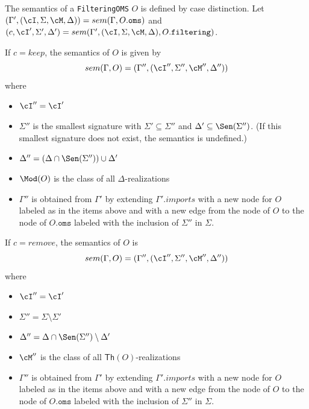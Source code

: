 \documentclass[10pt, a4paper]{isov2}
\newcommand*{\syntax}[1]{\texttt{#1}}
\renewcommand{\Th}{\mathsf{Th}}
\begin{document}
The semantics of a \syntax{FilteringOMS} $O$
is defined by case distinction.
Let
 $(\Gamma',(\cI,\Sigma,\cM, \Delta)) = sem(\Gamma, O.\syntax{oms})$ and \\
 $(c, \cI',\Sigma',\Delta') = sem(\Gamma', (\cI, \Sigma, \cM, \Delta), O.\syntax{filtering})$.

If $c = keep$,
the semantics of $O$ is given by
$$sem(\Gamma, O) = (\Gamma'',(\cI'',\Sigma'',\cM'',\Delta''))$$
\noindent where
\begin{itemize}
  \item $\cI'' = \cI'$
  \item $\Sigma''$ is the smallest signature
with $\Sigma'\subseteq\Sigma''$ and $\Delta'\subseteq\Sen(\Sigma'')$. ({If this smallest signature does not exist, the semantics is undefined.})
  \item $\Delta'' = (\Delta\cap\Sen(\Sigma''))\cup\Delta'$
  \item $\Mod(O)$ is the class of all $\Delta$-realizations
  \item $\Gamma''$ is obtained from
       $\Gamma'$
       by extending $\Gamma'.imports$
       with a new node for $O$ labeled as in the items above and
       with a new edge from the node of $O$ to the node of $O.\syntax{oms}$
        labeled with the inclusion of $\Sigma''$ in $\Sigma$.
\end{itemize}

\noindent
If $c = remove$, the semantics of $O$
is
$$sem(\Gamma, O) = (\Gamma'',(\cI'',\Sigma'',\cM'',\Delta''))$$
\noindent where
\begin{itemize}
  \item $\cI'' = \cI'$
  \item $\Sigma'' = \Sigma\setminus \Sigma'$
  \item $\Delta'' = \Delta\cap\Sen(\Sigma'')\setminus\Delta'$
  \item $\cM''$ is the class of all $\Th(O)$-realizations
    \item $\Gamma''$ is obtained from
       $\Gamma'$
       by extending $\Gamma'.imports$
       with a new node for $O$ labeled as in the items above and
       with a new edge from the node of $O$ to the node of $O.\syntax{oms}$
        labeled with the inclusion of $\Sigma''$ in $\Sigma$.
\end{itemize}

\end{document}
